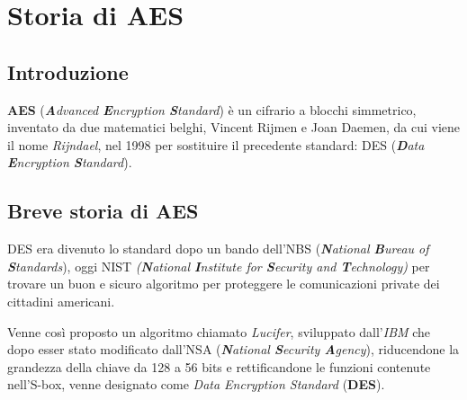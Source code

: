 
\chapter{Storia di AES}




\section{Introduzione}

  

\textsf{\small \textbf{AES} (\emph{\textbf{A}dvanced \textbf{E}ncryption \textbf{S}tandard}) è un cifrario a blocchi simmetrico, inventato da due matematici belghi, Vincent Rijmen e Joan Daemen, da cui viene il nome \emph{Rijndael}, nel 1998 per sostituire il precedente standard: DES (\emph{\textbf{D}ata \textbf{E}ncryption \textbf{S}tandard}).}



\section{Breve storia di AES} 

     

\textsf{\small DES era divenuto lo standard dopo un bando dell'NBS (\emph{\textbf{N}ational \textbf{B}ureau of \textbf{S}tandards}), oggi NIST \emph{(\textbf{N}ational \textbf{I}nstitute for \textbf{S}ecurity and \textbf{T}echnology)} per trovare un buon e sicuro algoritmo per proteggere le comunicazioni private dei cittadini americani.}


\textsf{\small Venne così proposto un algoritmo chiamato \emph{Lucifer}, sviluppato dall'\emph{IBM} che dopo esser stato modificato dall'NSA (\emph{\textbf{N}ational \textbf{S}ecurity \textbf{A}gency}), riducendone la grandezza della chiave da 128 a 56 bits e rettificandone le funzioni contenute nell'S-box, venne designato come \emph{Data Encryption Standard} (\textbf{DES}).}

